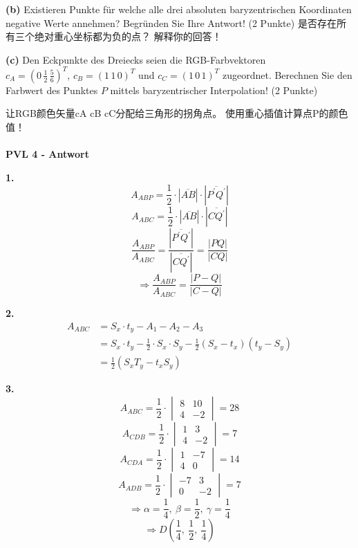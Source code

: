 \documentclass[fleqn]{article}
\begin{document}
\indent\textbf{(b)} Existieren Punkte für welche alle drei absoluten baryzentrischen Koordinaten negative Werte annehmen? Begründen Sie Ihre Antwort! (2 Punkte)
是否存在所有三个绝对重心坐标都为负的点？ 解释你的回答！

\indent\textbf{(c)} Den Eckpunkte des Dreiecks seien die RGB-Farbvektoren $c_A=(0\,\frac{1}{2}\,\frac{5}{6})^T,\,c_B=(1\,1\,0)^T$ und $c_C=(1\,0\,1)^T$ zugeordnet. Berechnen Sie den Farbwert des Punktes $P$ mittels baryzentrischer Interpolation! (2 Punkte)

让RGB颜色矢量cA cB cC分配给三角形的拐角点。 使用重心插值计算点P的颜色值！
\\
\\
\noindent\textbf{PVL 4 - Antwort}

\indent\textbf{1.}
$$A_{ABP} = \frac{1}{2} \cdot  |\overline{AB}| \cdot |\overline{P^{'}Q^{'}}|$$
$$A_{ABC} = \frac{1}{2} \cdot  |\overline{AB}| \cdot |\overline{CQ^{'}}|$$
$$\frac{A_{ABP}}{A_{ABC}} = \frac{|\overline{P^{'}Q^{'}}|}{|\overline{CQ^{'}}|} = \frac{|PQ|}{|CQ|}$$
$$\Rightarrow \frac{A_{ABP}}{A_{ABC}} = \frac{|P-Q|}{|C-Q|}$$


\indent\textbf{2.}
\begin{align*}
    A_{ABC} &= S_x \cdot t_y - A_1 - A_2 - A_3 \\
    &= S_x \cdot t_y - \frac{1}{2} \cdot S_x \cdot S_y - \frac{1}{2}(S_x - t_x)(t_y - S_y) \\
    &= \frac{1}{2}(S_xT_y-t_xS_y)
\end{align*}

\indent\textbf{3.}
$$A_{ABC} = \frac {1}{2} \cdot 
\begin{vmatrix}
    8 & 10 \\
    4 & -2
\end{vmatrix} = 28$$
$$
A_{CDB} = \frac {1}{2} \cdot 
\begin{vmatrix}
    1 & 3 \\
    4 & -2
\end{vmatrix} = 7
$$$$A_{CDA} = \frac {1}{2} \cdot 
\begin{vmatrix}
    1 & -7 \\
    4 & 0
\end{vmatrix} = 14
$$$$A_{ADB} = \frac {1}{2} \cdot 
\begin{vmatrix}
    -7 & 3 \\
    0 & -2
\end{vmatrix} = 7
$$
$$\Rightarrow \alpha = \frac{1}{4} ,\ \beta = \frac{1}{2} ,\ \gamma = \frac{1}{4}$$
$$\Rightarrow D(\frac{1}{4},\ \frac{1}{2},\ \frac{1}{4})$$
\end{document}
